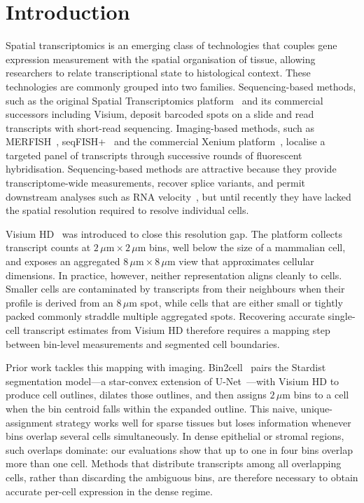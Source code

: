 \section{Introduction}

Spatial transcriptomics is an emerging class of technologies that couples gene expression measurement with the spatial organisation of tissue, allowing researchers to relate transcriptional state to histological context. These technologies are commonly grouped into two families. Sequencing-based methods, such as the original Spatial Transcriptomics platform~\cite{stahl2016spatialtranscriptomics} and its commercial successors including Visium, deposit barcoded spots on a slide and read transcripts with short-read sequencing. Imaging-based methods, such as MERFISH~\cite{chen2015merfish,moffitt2018merfish}, seqFISH+~\cite{eng2019transcriptome} and the commercial Xenium platform~\cite{janesick2023xenium,rao2021xenium}, localise a targeted panel of transcripts through successive rounds of fluorescent hybridisation. Sequencing-based methods are attractive because they provide transcriptome-wide measurements, recover splice variants, and permit downstream analyses such as RNA velocity~\cite{lamanno2018rnavelocity}, but until recently they have lacked the spatial resolution required to resolve individual cells.

Visium HD~\cite{10xvisiumhd2024} was introduced to close this resolution gap. The platform collects transcript counts at $2\,\mu\mathrm{m}\times 2\,\mu\mathrm{m}$ bins, well below the size of a mammalian cell, and exposes an aggregated $8\,\mu\mathrm{m}\times 8\,\mu\mathrm{m}$ view that approximates cellular dimensions. In practice, however, neither representation aligns cleanly to cells. Smaller cells are contaminated by transcripts from their neighbours when their profile is derived from an $8\,\mu\mathrm{m}$ spot, while cells that are either small or tightly packed commonly straddle multiple aggregated spots. Recovering accurate single-cell transcript estimates from Visium HD therefore requires a mapping step between bin-level measurements and segmented cell boundaries.

Prior work tackles this mapping with imaging. Bin2cell~\cite{polacco2024bin2cell} pairs the Stardist~\cite{schmidt2018stardist} segmentation model---a star-convex extension of U-Net~\cite{ronneberger2015unet}---with Visium HD to produce cell outlines, dilates those outlines, and then assigns $2\,\mu\mathrm{m}$ bins to a cell when the bin centroid falls within the expanded outline. This naive, unique-assignment strategy works well for sparse tissues but loses information whenever bins overlap several cells simultaneously. In dense epithelial or stromal regions, such overlaps dominate: our evaluations show that up to one in four bins overlap more than one cell. Methods that distribute transcripts among all overlapping cells, rather than discarding the ambiguous bins, are therefore necessary to obtain accurate per-cell expression in the dense regime.

